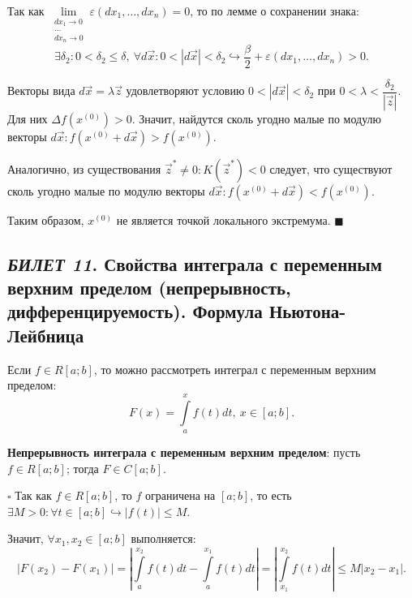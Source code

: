 \documentclass[12pt, a4paper, reqno]{article}
\begin{document}
    Так как $\lim\limits_{\substack{dx_1 \to 0 \\ \ldots \\ dx_n \to 0}} \varepsilon(dx_1, \ldots, dx_n) = 0$,
    то по лемме о сохранении знака:
    \begin{equation*}
        \exists \delta_2: 0 < \delta_2 \leq \delta,\ \forall d\vec{x}: 0 < |d\vec{x}| < \delta_2
        \hookrightarrow \frac{\beta}{2} + \varepsilon(dx_1, \ldots, dx_n) > 0.
    \end{equation*}

    Векторы вида $d\vec{x} = \lambda\vec{z}$ удовлетворяют условию $0 < |d\vec{x}| < \delta_2$ при
    $0 < \lambda < \dfrac{\delta_2}{|\vec{z}|}$. Для них $\Delta f(x^{(0)}) > 0$. Значит, найдутся
    сколь угодно малые по модулю векторы $d\vec{x}: f(x^{(0)} + d\vec{x}) > f(x^{(0)})$.

    Аналогично, из существования $\vec{z}^{*} \neq 0: K(\vec{z}^{*}) < 0$ следует, что существуют
    сколь угодно малые по модулю векторы $d\vec{x}: f(x^{(0)} + d\vec{x}) < f(x^{(0)})$.

    Таким образом, $x^{(0)}$ не является точкой локального экстремума.
    $\blacksquare$

\newpage
\subsection{\textit{БИЛЕТ 11}. Свойства интеграла с переменным верхним пределом (непрерывность,
            дифференцируемость). Формула Ньютона-Лейбница}

    Если $f \in R[a; b]$, то можно рассмотреть интеграл с переменным верхним пределом:
    \begin{equation*}
        F(x) = \int\limits_{a}^{x} f(t)dt,\ x \in [a; b].
    \end{equation*}

    \textbf{Непрерывность интеграла с переменным верхним пределом}: пусть $f \in R[a; b]$;
    тогда $F \in C[a; b]$.

    $\square$
    Так как $f \in R[a; b]$, то $f$ ограничена на $[a; b]$, то есть
    $\exists M > 0: \forall t \in [a; b] \hookrightarrow |f(t)| \leq M$.

    Значит, $\forall x_1, x_2 \in [a; b]$ выполняется:
    \begin{equation*}
        |F(x_2) - F(x_1)| = \left|\int\limits_{a}^{x_2} f(t)dt - \int\limits_{a}^{x_1} f(t)dt\right| =
        \left|\int\limits_{x_1}^{x_2} f(t)dt\right| \leq M|x_2 - x_1|.
    \end{equation*}
\end{document}

